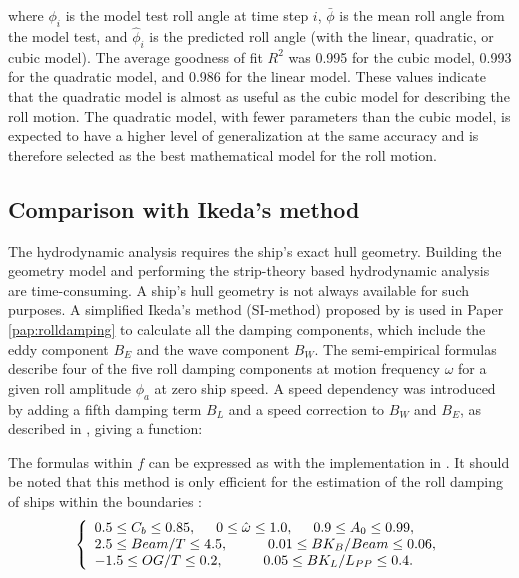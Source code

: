 where $\phi_i$ is the model test roll angle at time step $i$, $\bar \phi$ is the mean roll angle from the model test, and $\hat{\phi}_i$ is the predicted roll angle (with the linear, quadratic, or cubic model). The average goodness of fit $R^2$ was 0.995 for the cubic model, 0.993 for the quadratic model, and 0.986 for the linear model. These values indicate that the quadratic model is almost as useful as the cubic model for describing the roll motion. The quadratic model, with fewer parameters than the cubic model, is expected to have a higher level of generalization at the same accuracy and is therefore selected as the best mathematical model for the roll motion. 

\subsection{Comparison with Ikeda's method}
The hydrodynamic analysis requires the ship's exact hull geometry. Building the geometry model and performing the strip-theory based hydrodynamic analysis are time-consuming. A ship's hull geometry is not always available for such purposes. A simplified Ikeda's method (SI-method) proposed by \textcite{kawaharaSimplePredictionFormula2011} is used in Paper \ref{pap:rolldamping} to calculate all the damping components, which include the eddy component $B_E$ and the wave component $B_W$. The semi-empirical formulas describe four of the five roll damping components at motion frequency $\omega$ for a given roll amplitude $\phi_a$ at zero ship speed. A speed dependency was introduced by adding a fifth damping term $B_L$ and a speed correction to $B_W$ and $B_E$, as described in \textcite{ikedaVelocityFieldShip1979}, giving a function: 


\noindent The formulas within $f$ can be expressed as \textcite{ikedaVelocityFieldShip1979, kawaharaSimplePredictionFormula2011} with the implementation in \textcite{alexanderssonRolldecayestimators2022}.
It should be noted that this method is only efficient for the estimation of the roll damping of ships within the boundaries \parencite{kawaharaSimplePredictionFormula2011}:
\begin{equation}
    \label{eq:SI_limits}
     \left\{
     \begin{array}{ll}
    0.5 \leq C_b \leq 0.85,\hspace{0.5cm} 
    0 \leq \hat{\omega} \leq 1.0,
    \hspace{0.5cm}
    0.9 \leq A_0 \leq 0.99,\\
    2.5\leq Beam/T \leq 4.5, \hspace{1cm}
    0.01 \leq BK_B/Beam \leq 0.06, \\
        -1.5 \leq OG/T \leq 0.2,
     \hspace{1cm}
    0.05 \leq BK_L/L_{PP} \leq 0.4.
    \end{array}
    \right.
\end{equation}

